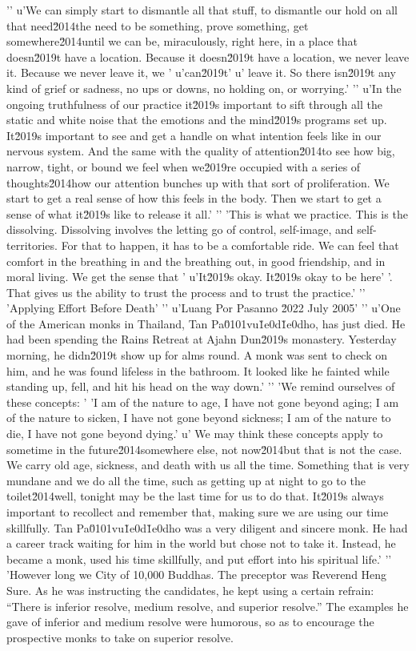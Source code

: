'\n'
u'We can simply start to dismantle all that stuff, to dismantle our hold on all that need\u2014the need to be something, prove something, get somewhere\u2014until we can be, miraculously, right here, in a place that doesn\u2019t have a location. Because it doesn\u2019t have a location, we never leave it. Because we never leave it, we '
u'can\u2019t'
u' leave it. So there isn\u2019t any kind of grief or sadness, no ups or downs, no holding on, or worrying.'
'\n'
u'In the ongoing truthfulness of our practice it\u2019s important to sift through all the static and white noise that the emotions and the mind\u2019s programs set up. It\u2019s important to see and get a handle on what intention feels like in our nervous system. And the same with the quality of attention\u2014to see how big, narrow, tight, or bound we feel when we\u2019re occupied with a series of thoughts\u2014how our attention bunches up with that sort of proliferation. We start to get a real sense of how this feels in the body. Then we start to get a sense of what it\u2019s like to release it all.'
'\n'
'This is what we practice. This is the dissolving. Dissolving involves the letting go of control, self-image, and self-territories. For that to happen, it has to be a comfortable ride. We can feel that comfort in the breathing in and the breathing out, in good friendship, and in moral living. We get the sense that '
u'It\u2019s okay. It\u2019s okay to be here'
'. That gives us the ability to trust the process and to trust the practice.'
'\n'
'Applying Effort Before Death'
'\n'
u'Luang Por Pasanno \u2022 July 2005'
'\n'
u'One of the American monks in Thailand, Tan Pa\u0101vu\u1e0d\u1e0dho, has just died. He had been spending the Rains Retreat at Ajahn Dun\u2019s monastery. Yesterday morning, he didn\u2019t show up for alms round. A monk was sent to check on him, and he was found lifeless in the bathroom. It looked like he fainted while standing up, fell, and hit his head on the way down.'
'\n'
'We remind ourselves of these concepts: '
'I am of the nature to age, I have not gone beyond aging; I am of the nature to sicken, I have not gone beyond sickness; I am of the nature to die, I have not gone beyond dying.'
u' We may think these concepts apply to sometime in the future\u2014somewhere else, not now\u2014but that is not the case. We carry old age, sickness, and death with us all the time. Something that is very mundane and we do all the time, such as getting up at night to go to the toilet\u2014well, tonight may be the last time for us to do that. It\u2019s always important to recollect and remember that, making sure we are using our time skillfully. Tan Pa\u0101vu\u1e0d\u1e0dho was a very diligent and sincere monk. He had a career track waiting for him in the world but chose not to take it. Instead, he became a monk, used his time skillfully, and put effort into his spiritual life.'
'\n'
'However long we City of 10,000 Buddhas. The preceptor was Reverend 
Heng Sure. As he was instructing the candidates, he kept using a 
certain refrain: ``There is inferior resolve, medium resolve, and 
superior resolve.'' The examples he gave of inferior and medium resolve 
were humorous, so as to encourage the prospective monks to take on 
superior resolve.

